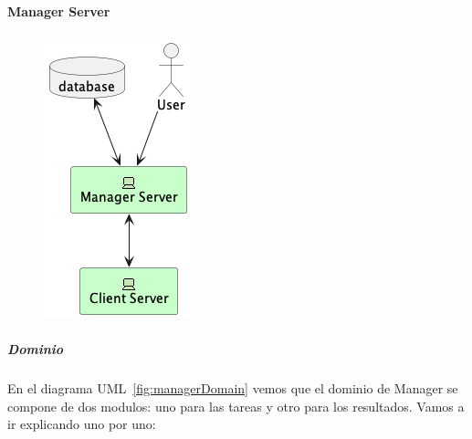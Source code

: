 \paragraph{Manager Server}

\begin{figure}[H]
    \centering
    \includegraphics[height=0.4\textheight]{part/memoria_descriptiva/managerServerConcept}
    \caption[Diagrama componentes]{}\label{fig:managerServerConcept}
\end{figure}

\subparagraph{Dominio}

En el diagrama UML~\ref{fig:managerDomain} vemos que el dominio de Manager se compone de dos modulos: uno para las tareas y otro para los resultados. Vamos a ir explicando uno por uno:

